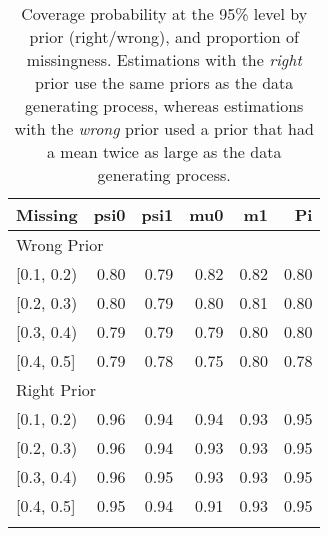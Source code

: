 \begin{table}[ht]
\centering
\begin{tabular}{lrrrrr}
  \toprule
Missing & psi0 & psi1 & mu0 & m1 & Pi \\ 
  \midrule
\multicolumn{6}{l}{Wrong Prior}\\
{[0.1, 0.2)} & 0.80 & 0.79 & 0.82 & 0.82 & 0.80 \\ 
  {[0.2, 0.3)} & 0.80 & 0.79 & 0.80 & 0.81 & 0.80 \\ 
  {[0.3, 0.4)} & 0.79 & 0.79 & 0.79 & 0.80 & 0.80 \\ 
  {[0.4, 0.5]} & 0.79 & 0.78 & 0.75 & 0.80 & 0.78 \\ 
   \midrule
\multicolumn{6}{l}{Right Prior}\\
{[0.1, 0.2)} & 0.96 & 0.94 & 0.94 & 0.93 & 0.95 \\ 
  {[0.2, 0.3)} & 0.96 & 0.94 & 0.93 & 0.93 & 0.95 \\ 
  {[0.3, 0.4)} & 0.96 & 0.95 & 0.93 & 0.93 & 0.95 \\ 
  {[0.4, 0.5]} & 0.95 & 0.94 & 0.91 & 0.93 & 0.95 \\ 
   \bottomrule
\multicolumn{6}{l}{}\\
\end{tabular}
\caption{Coverage probability at the 95\% level by prior (right/wrong), and proportion of missingness. Estimations with the \emph{right} prior use the same priors as the data generating process, whereas estimations with the \emph{wrong} prior used a prior that had a mean twice as large as the data generating process.} 
\label{tab:coverage95-method-missigness}
\end{table}
